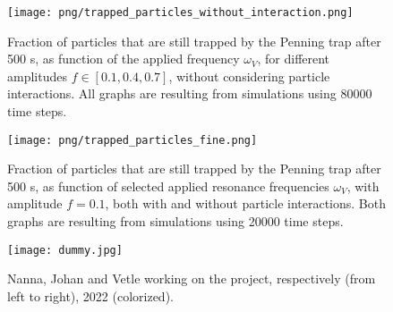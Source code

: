 \begin{figure}
    \texttt{[image: png/trapped\_particles\_without\_interaction.png]}
    \caption{Fraction of particles that are still trapped by the Penning trap after 500 \textmu s, as function of the applied frequency $\omega_V$, for different amplitudes $f\in[0.1, 0.4, 0.7]$, without considering particle interactions. All graphs are resulting from simulations using 80000 time steps.}
    \label{fig:trapped_without}
\end{figure}

\begin{figure}
    \texttt{[image: png/trapped\_particles\_fine.png]}
    \caption{Fraction of particles that are still trapped by the Penning trap after 500 \textmu s, as function of selected applied resonance frequencies $\omega_V$, with amplitude $f=0.1$, both with and without particle interactions. Both graphs are resulting from simulations using 20000 time steps.}
    \label{fig:trapped_with}
\end{figure}



\begin{figure}
    \texttt{[image: dummy.jpg]}
    \caption{Nanna, Johan and Vetle working on the project, respectively (from left to right), 2022 (colorized).}
    \label{fig:some_ref} 
\end{figure} 




 





